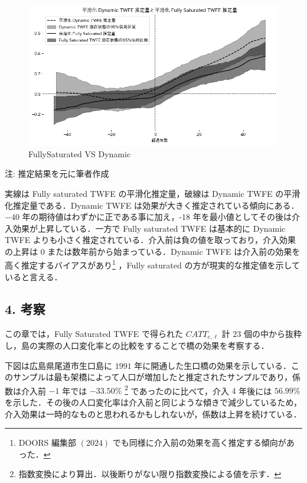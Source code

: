 \begin{figure}
\centering
\includegraphics{../../docs//figures//fully_saturated_twfe//fs_vs_dynamic.png}
\caption{FullySaturated VS Dynamic}
\end{figure}

注: 推定結果を元に筆者作成

実線は Fully saturated TWFE の平滑化推定量，破線は Dynamic TWFE
の平滑化推定量である．Dynamic TWFE
は効果が大きく推定されている傾向にある．\(-40\)
年の期待値はわずかに正である事に加え，\(‐18\)
年を最小値としてその後は介入効果が上昇している．一方で Fully saturated
TWFE は基本的に Dynamic TWFE
よりも小さく推定されている．介入前は負の値を取っており，介入効果の上昇は
\(0\) または数年前から始まっている．Dynamic TWFE
は介入前の効果を高く推定するバイアスがあり\footnote{DOORS 編集部
  \((2024)\) でも同様に介入前の効果を高く推定する傾向があった．} ，Fully
saturated の方が現実的な推定値を示していると言える．

\hypertarget{ux8003ux5bdf}{%
\subsection{4. 考察}\label{ux8003ux5bdf}}

この章では，Fully Saturated TWFE で得られた \(CATT_{e, \ell}\) 計 \(23\)
個の中から抜粋し，島の実際の人口変化率との比較をすることで橋の効果を考察する．

下図は広島県尾道市生口島に \(1991\)
年に開通した生口橋の効果を示している．このサンプルは最も架橋によって人口が増加したと推定されたサンプルであり，係数は介入前
\(-1\) 年では \(-33.50\%\) \footnote{指数変換により算出．以後断りがない限り指数変換による値を示す．}
であったのに比べて，介入 \(4\) 年後には \(56.99\%\)
を示した．その後の人口変化率は介入前と同じような傾きで減少しているため，介入効果は一時的なものと思われるかもしれないが，係数は上昇を続けている．

